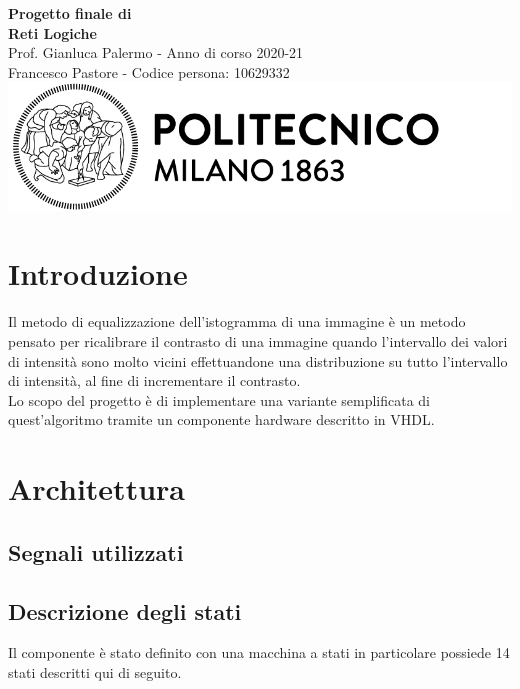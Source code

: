 \documentclass{article}
\begin{document}
\begin{titlepage}
    \centering
    \vspace*{\fill}
    \Huge\textbf{Progetto finale di \\ Reti Logiche}\\
    \vspace{5mm} %
    \Large Prof. Gianluca Palermo - Anno di corso 2020-21\\
    \vspace{5mm} %
    \large Francesco Pastore - Codice persona: 10629332\\
    \vspace{100mm}
    \includegraphics[scale=0.7]{logo.png}
    \vspace*{\fill}
\end{titlepage}

\thispagestyle{empty}
\tableofcontents
\pagebreak

\section{Introduzione}
\noindent
Il metodo di equalizzazione dell’istogramma di una immagine è un metodo pensato per ricalibrare il contrasto di una immagine quando l’intervallo dei valori di intensità sono molto vicini effettuandone una distribuzione su tutto l’intervallo di intensità, al fine di incrementare il contrasto. \\
Lo scopo del progetto è di implementare una variante semplificata di quest'algoritmo tramite un componente hardware descritto in VHDL.


\pagebreak
{}
\section{Architettura}

\subsection{Segnali utilizzati}

\pagebreak
\subsection{Descrizione degli stati}
Il componente è stato definito con una macchina a stati in particolare possiede 14 stati descritti qui di seguito.
\end{document}

